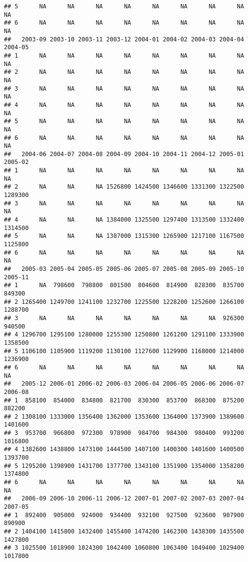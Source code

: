 \documentclass[
]{article}
\begin{document}
\begin{verbatim}
## 5      NA      NA      NA      NA      NA      NA      NA      NA      NA
## 6      NA      NA      NA      NA      NA      NA      NA      NA      NA
##   2003-09 2003-10 2003-11 2003-12 2004-01 2004-02 2004-03 2004-04 2004-05
## 1      NA      NA      NA      NA      NA      NA      NA      NA      NA
## 2      NA      NA      NA      NA      NA      NA      NA      NA      NA
## 3      NA      NA      NA      NA      NA      NA      NA      NA      NA
## 4      NA      NA      NA      NA      NA      NA      NA      NA      NA
## 5      NA      NA      NA      NA      NA      NA      NA      NA      NA
## 6      NA      NA      NA      NA      NA      NA      NA      NA      NA
##   2004-06 2004-07 2004-08 2004-09 2004-10 2004-11 2004-12 2005-01 2005-02
## 1      NA      NA      NA      NA      NA      NA      NA      NA      NA
## 2      NA      NA      NA 1526800 1424500 1346600 1331300 1322500 1289300
## 3      NA      NA      NA      NA      NA      NA      NA      NA      NA
## 4      NA      NA      NA 1384000 1325500 1297400 1313500 1332400 1314500
## 5      NA      NA      NA 1387000 1315300 1265900 1217100 1167500 1125800
## 6      NA      NA      NA      NA      NA      NA      NA      NA      NA
##   2005-03 2005-04 2005-05 2005-06 2005-07 2005-08 2005-09 2005-10 2005-11
## 1      NA  798600  798800  801500  804600  814900  828300  835700  849300
## 2 1265400 1249700 1241100 1232700 1225500 1228200 1252600 1266100 1288700
## 3      NA      NA      NA      NA      NA      NA      NA  926300  940500
## 4 1296700 1295100 1280000 1255300 1250800 1261200 1291100 1333900 1358500
## 5 1106100 1105900 1119200 1130100 1127600 1129900 1168000 1214000 1236900
## 6      NA      NA      NA      NA      NA      NA      NA      NA      NA
##   2005-12 2006-01 2006-02 2006-03 2006-04 2006-05 2006-06 2006-07 2006-08
## 1  858100  854000  834800  821700  830300  853700  868300  875200  882200
## 2 1308100 1333000 1356400 1362000 1353600 1364000 1373900 1389600 1401600
## 3  953700  966800  972300  978900  984700  984300  980400  993200 1016800
## 4 1382600 1438800 1473100 1444500 1407100 1400300 1401600 1400500 1393700
## 5 1295200 1398900 1431700 1377700 1343100 1351900 1354000 1358200 1374800
## 6      NA      NA      NA      NA      NA      NA      NA      NA      NA
##   2006-09 2006-10 2006-11 2006-12 2007-01 2007-02 2007-03 2007-04 2007-05
## 1  892400  905000  924000  934400  932100  927500  923600  907900  890900
## 2 1404100 1415800 1432400 1455400 1474200 1462300 1438300 1435500 1427800
## 3 1025500 1018900 1024300 1042400 1060800 1063400 1049400 1029400 1017800

\end{verbatim}
\end{document}
